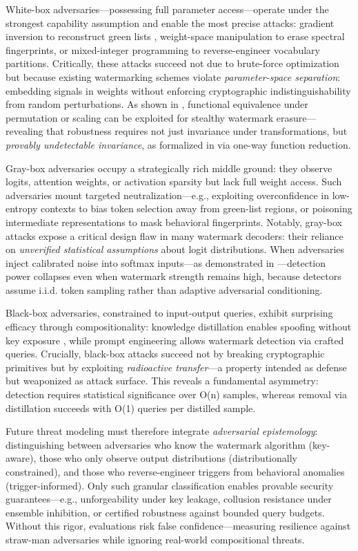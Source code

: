 \documentclass[11pt,a4paper]{article}
\begin{document}
White-box adversaries---possessing full parameter access---operate under the strongest capability assumption and enable the most precise attacks: gradient inversion to reconstruct green lists \cite{arxiv:2402.19361}, weight-space manipulation to erase spectral fingerprints, or mixed-integer programming to reverse-engineer vocabulary partitions. Critically, these attacks succeed not due to brute-force optimization but because existing watermarking schemes violate \emph{parameter-space separation}: embedding signals in weights without enforcing cryptographic indistinguishability from random perturbations. As shown in \cite{doi:10.1109/icassp48485.2024.10447264}, functional equivalence under permutation or scaling can be exploited for stealthy watermark erasure---revealing that robustness requires not just invariance under transformations, but \emph{provably undetectable invariance}, as formalized in \cite{arxiv:2405.13517} via one-way function reduction.

Gray-box adversaries occupy a strategically rich middle ground: they observe logits, attention weights, or activation sparsity but lack full weight access. Such adversaries mount targeted neutralization---e.g., exploiting overconfidence in low-entropy contexts to bias token selection away from green-list regions, or poisoning intermediate representations to mask behavioral fingerprints. Notably, gray-box attacks expose a critical design flaw in many watermark decoders: their reliance on \emph{unverified statistical assumptions} about logit distributions. When adversaries inject calibrated noise into softmax inputs---as demonstrated in \cite{arxiv:2402.16187}---detection power collapses even when watermark strength remains high, because detectors assume i.i.d. token sampling rather than adaptive adversarial conditioning.

Black-box adversaries, constrained to input-output queries, exhibit surprising efficacy through compositionality: knowledge distillation enables spoofing without key exposure \cite{arxiv:2402.19361}, while prompt engineering allows watermark detection via crafted queries. Crucially, black-box attacks succeed not by breaking cryptographic primitives but by exploiting \emph{radioactive transfer}---a property intended as defense but weaponized as attack surface. This reveals a fundamental asymmetry: detection requires statistical significance over O(n) samples, whereas removal via distillation succeeds with O(1) queries per distilled sample.

Future threat modeling must therefore integrate \emph{adversarial epistemology}: distinguishing between adversaries who know the watermark algorithm (key-aware), those who only observe output distributions (distributionally constrained), and those who reverse-engineer triggers from behavioral anomalies (trigger-informed). Only such granular classification enables provable security guarantees---e.g., unforgeability under key leakage, collusion resistance under ensemble inhibition, or certified robustness against bounded query budgets. Without this rigor, evaluations risk false confidence---measuring resilience against straw-man adversaries while ignoring real-world compositional threats.
\end{document}
